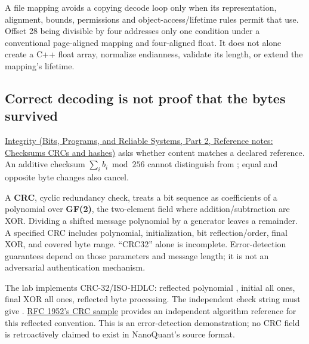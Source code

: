 A file mapping avoids a copying decode loop only when its representation, alignment, bounds, permissions and object-access/lifetime rules permit that use. Offset 28 being divisible by four addresses only one condition under a conventional page-aligned mapping and four-aligned float. It does not alone create a C++ float array, normalize endianness, validate its length, or extend the mapping's lifetime.

\subsection{Correct decoding is not proof that the bytes survived}\label{05-engine-i-ch002-correct-decoding-is-not-proof-that-the-bytes-survived}

\hypertarget{05-engine-i-ch002-correct-decoding-is-not-proof-that-the-bytes-survived}{}

\href{../01-Bits-Programs-and-Reliable-Systems-P02/main.pdf\#nameddest=appendix-ed338677de0a}{Integrity (Bits, Programs, and Reliable Systems, Part 2, Reference notes: Checksums CRCs and hashes)} asks whether content matches a declared reference. An additive checksum \(\sum_i b_i\bmod256\) cannot distinguish  from ; equal and opposite byte changes also cancel.

A \textbf{CRC}, cyclic redundancy check, treats a bit sequence as coefficients of a polynomial over \textbf{GF(2)}, the two-element field where addition/subtraction are XOR. Dividing a shifted message polynomial by a generator leaves a remainder. A specified CRC includes polynomial, initialization, bit reflection/order, final XOR, and covered byte range. ``CRC32'' alone is incomplete. Error-detection guarantees depend on those parameters and message length; it is not an adversarial authentication mechanism.

The lab implements CRC-32/ISO-HDLC: reflected polynomial , initial all ones, final XOR all ones, reflected byte processing. The independent check string  must give . \href{https://www.rfc-editor.org/rfc/rfc1952\#section-8}{RFC 1952's CRC sample} provides an independent algorithm reference for this reflected convention. This is an error-detection demonstration; no CRC field is retroactively claimed to exist in NanoQuant's source format.

